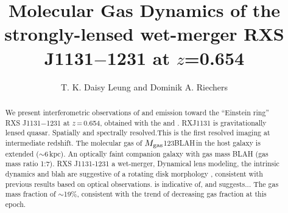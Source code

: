 \documentclass[]{emulateapj}
\begin{document}

\title{Molecular Gas Dynamics of the strongly-lensed wet-merger RXS J1131$-$1231 at $z$=0.654}
\author{T. K. Daisy Leung and Dominik A. Riechers}


\begin{abstract}
We present interferometric observations of \bco and \cco emission toward the ``Einstein ring''
RXS J1131$-$1231 at $z$\,=\,0.654, obtained with the \pdbi and \carma. 
RXJ1131 is gravitationally lensed quasar.
Spatially and spectrally resolved.This is the first resolved \bco imaging at intermediate redshift.
The molecular gas of $M_{\rm gas}$\eq123BLAH\,\Msun in the host galaxy 
is extended ($\sim$6\,kpc). An optically faint companion galaxy with gas mass BLAH (gas mass ratio 1:7). 
RXS J1131-1231 a wet-merger, 
Dynamical lens modeling, the intrinsic dynamics and blah are suggestive of a rotating disk morphology , consistent with previous results based on optical observations.
is indicative of, and suggests...
The gas mass fraction of $\sim$19\%, consistent with the trend of decreasing gas fraction at this epoch.
\end{abstract}


\end{document}
